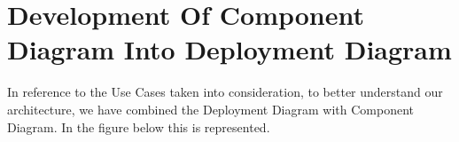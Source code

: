 \newpage \chapter{\textbf{Development Of Component Diagram Into Deployment Diagram}}

In reference to the Use Cases taken into consideration, to better understand our architecture, we have combined the Deployment Diagram with Component Diagram. In the figure below this is represented.

\begin{center}
\end{center}
\bigskip
{}